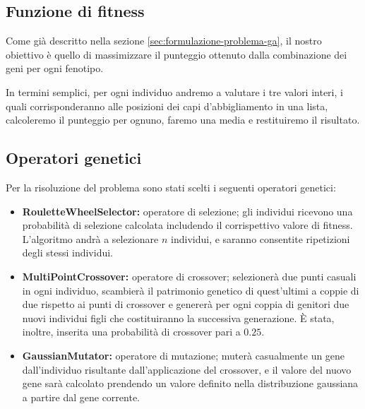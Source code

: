 \documentclass[a4paper, 11pt, oneside]{report}
\begin{document}
                \subsection{Funzione di fitness}
                \par \noindent Come già descritto nella sezione \ref{sec:formulazione-problema-ga}, il
                nostro obiettivo è quello di massimizzare il punteggio ottenuto dalla combinazione dei geni per ogni
                fenotipo.
                \par \noindent In termini semplici, per ogni individuo andremo a valutare i tre valori interi, i quali
                corrisponderanno alle posizioni dei capi d'abbigliamento in una lista, calcoleremo il punteggio per ognuno,
                faremo una media e restituiremo il risultato.

                \subsection{Operatori genetici}\label{subsec:op_gen}
                Per la risoluzione del problema sono stati scelti i seguenti operatori genetici:
                \begin{itemize}
                    \item \textbf{RouletteWheelSelector:} operatore di selezione;
                    gli individui ricevono una probabilità
                    di selezione calcolata includendo il corrispettivo valore di fitness.
                    L'algoritmo andrà a selezionare
                    $n$ individui, e saranno consentite ripetizioni degli stessi individui.
                    \item \textbf{MultiPointCrossover:} operatore di crossover;
                    selezionerà due punti casuali in ogni
                    individuo, scambierà il patrimonio genetico di quest'ultimi a coppie di due rispetto ai punti di
                    crossover e genererà per ogni coppia di genitori due nuovi individui figli che costituiranno la
                    successiva generazione.
                    È stata, inoltre, inserita una probabilità di crossover pari a $0.25$.
                    \item \textbf{GaussianMutator:} operatore di mutazione;
                    muterà casualmente un gene dall'individuo
                    risultante dall'applicazione del crossover, e il valore del nuovo gene sarà calcolato prendendo un
                    valore definito nella distribuzione gaussiana a partire dal gene corrente.
                \end{itemize}
\end{document}
